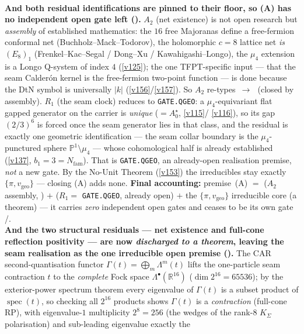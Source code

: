 \documentclass[11pt,a4paper]{article}
\newcommand{\Nfam}{N_{\mathrm{fam}}}
\newcommand{\PP}{\mathbb P^1}
\begin{document}
\begin{keybox}
\smallskip\\
\noindent\textbf{And both residual identifications are pinned to their floor, so (A) has no independent open
gate left ().} $A_2$ (net existence) is not open research but
\emph{assembly} of established mathematics: the $16$ free Majoranas define a free-fermion conformal net
(Buchholz--Mack--Todorov), the holomorphic $c{=}8$ lattice net \emph{is} $(E_8)_1$ (Frenkel--Kac--Segal /
Dong--Xu / Kawahigashi--Longo), the $\mu_4$ extension is a Longo Q-system of index $4$ (\vref{v125}); the
one TFPT-specific input --- that the seam Calder\'on kernel is the free-fermion two-point function --- is
done because the DtN symbol is universally $|k|$ (\vref{v156}/\vref{v157}). So $A_2$ re-types
\mO$\,\to\,$\mC\ (closed by assembly). $R_1$ (the seam clock) reduces to \texttt{GATE.QGEO}: a
$\mu_4$-equivariant flat gapped generator on the carrier is \emph{unique} ($=A_0^\star$, \vref{v115}/%
\vref{v116}), so its gap $(2/3)^6$ is forced once the seam generator lies in that class, and the residual is
exactly one geometric identification --- the seam collar boundary is the $\mu_4$-punctured sphere
$\PP\setminus\mu_4$ --- whose cohomological half is already established (\vref{v137},
$b_1{=}3{=}\Nfam$). That is \texttt{GATE.QGEO}, an already-open realisation premise, \emph{not} a new gate.
By the No-Unit Theorem (\vref{v153}) the irreducibles stay exactly $\{\pi,v_{\mathrm{geo}}\}$ --- closing
(A) adds none. \textbf{Final accounting:} premise~(A) $=$ ($A_2$ assembly, \mC) $+$ ($R_1{=}$%
\texttt{GATE.QGEO}, already open) $+$ the $\{\pi,v_{\mathrm{geo}}\}$ irreducible core (a theorem) --- it
carries \emph{zero} independent open gates and ceases to be its own gate \mE/\mO.
\smallskip\\
\noindent\textbf{And the two structural residuals --- net existence and full-cone reflection positivity ---
are now \emph{discharged to a theorem}, leaving the seam realisation as the one irreducible open premise
().} The CAR second-quantisation functor
$\Gamma(t){=}\bigoplus_m\Lambda^m(t)$ lifts the one-particle seam contraction $t$ to the \emph{complete}
Fock space $\Lambda^\bullet(\mathbb R^{16})$ ($\dim 2^{16}{=}65536$); by the exterior-power spectrum theorem
every eigenvalue of $\Gamma(t)$ is a subset product of $\operatorname{spec}(t)$, so checking all $2^{16}$
products shows $\Gamma(t)$ is a \emph{contraction} (full-cone RP), with eigenvalue-$1$ multiplicity
$2^8{=}256$ (the wedges of the rank-$8$ $K_\Sigma$ polarisation) and sub-leading eigenvalue exactly the

\end{keybox}
\end{document}
